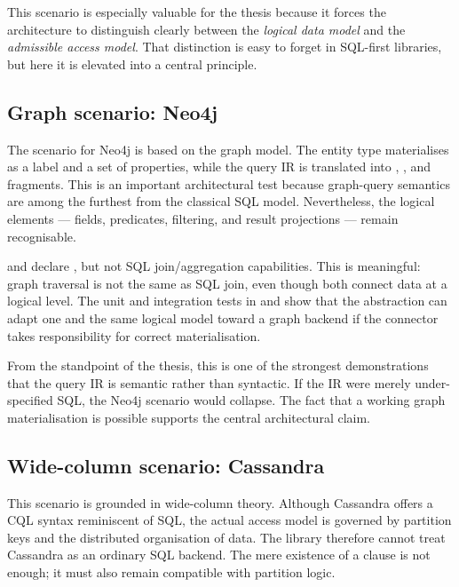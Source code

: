 This scenario is especially valuable for the thesis because it forces the architecture to distinguish clearly between the \emph{logical data model} and the \emph{admissible access model}. That distinction is easy to forget in SQL-first libraries, but here it is elevated into a central principle.

\subsection{Graph scenario: Neo4j}

The scenario for Neo4j is based on the graph model. The entity type materialises as a label and a set of properties, while the query IR is translated into , , and  fragments. This is an important architectural test because graph-query semantics are among the furthest from the classical SQL model. Nevertheless, the logical elements --- fields, predicates, filtering, and result projections --- remain recognisable.

 and  declare , but not SQL join/aggregation capabilities. This is meaningful: graph traversal is not the same as SQL join, even though both connect data at a logical level. The unit and integration tests in  and  show that the abstraction can adapt one and the same logical model toward a graph backend if the connector takes responsibility for correct materialisation.

From the standpoint of the thesis, this is one of the strongest demonstrations that the query IR is semantic rather than syntactic. If the IR were merely under-specified SQL, the Neo4j scenario would collapse. The fact that a working graph materialisation is possible supports the central architectural claim.

\subsection{Wide-column scenario: Cassandra}

This scenario is grounded in wide-column theory. Although Cassandra offers a CQL syntax reminiscent of SQL, the actual access model is governed by partition keys and the distributed organisation of data. The library therefore cannot treat Cassandra as an ordinary SQL backend. The mere existence of a  clause is not enough; it must also remain compatible with partition logic.

